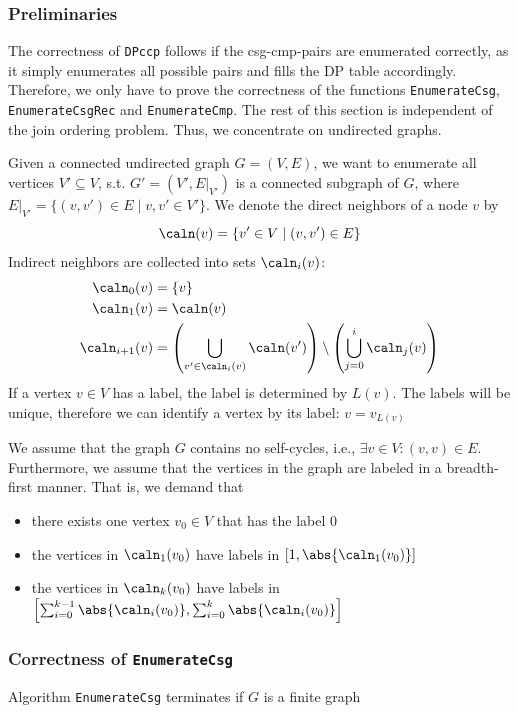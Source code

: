 \documentclass[11pt]{article}
\begin{document}
\subsubsection{Preliminaries}
\label{sec:orga0774e3}
The correctness of \texttt{DPccp} follows if the csg-cmp-pairs are enumerated correctly, as it simply
enumerates all possible pairs and fills the DP table accordingly. Therefore, we only have to prove the
correctness of the functions \texttt{EnumerateCsg}, \texttt{EnumerateCsgRec} and \texttt{EnumerateCmp}. The rest of this section
is independent of the join ordering problem. Thus, we concentrate on undirected graphs.

Given a connected undirected graph \(G=(V,E)\), we want to enumerate all vertices \(V'\subseteq V\),
s.t. \(G'=(V',E|_{V'})\) is a connected subgraph of \(G\), where
\(E|_{V'}=\{(v,v')\in E\mid v,v'\in V'\}\). We denote the direct neighbors of a node \(v\) by
\begin{equation*}
\caln(v)=\{v'\in V\mid(v,v')\in E\}
\end{equation*}
Indirect neighbors are collected into sets \(\caln_i(v)\):
\begin{align*}
\caln_0(v)&=\{v\}\\
\caln_1(v)&=\caln(v)\\
\caln_{i+1}(v)&=\left(\bigcup_{v'\in\caln_i(v)}\caln(v')\right)\setminus\left(\bigcup_{j=0}^i\caln_j(v)\right)
\end{align*}
If a vertex \(v\in V\) has a label, the label is determined by \(L(v)\). The labels will be unique,
therefore we can identify a vertex by its label: \(v=v_{L(v)}\)

We assume that the graph \(G\) contains no self-cycles, i.e., \(\exists v\in V:(v,v)\in E\).
Furthermore, we assume that the vertices in the graph are labeled in a breadth-first manner. That is,
we demand that
\begin{itemize}
\item there exists one vertex \(v_0\in V\) that has the label 0
\item the vertices in \(\caln_1(v_0)\) have labels in \([1,\abs{\caln_1(v_0)}]\)
\item the vertices in \(\caln_k(v_0)\) have labels in
\(\left[\sum_{i=0}^{k-1}\abs{\caln_i(v_0)},\sum_{i=0}^k\abs{\caln_i(v_0)}\right]\)
\end{itemize}
\subsubsection{Correctness of \texttt{EnumerateCsg}}
\label{sec:org7b55145}
\begin{lemma}[]
\label{1}
Algorithm \texttt{EnumerateCsg} terminates if \(G\) is a finite graph
\end{lemma}
\end{document}
